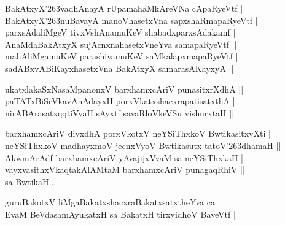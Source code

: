 \begin{entry}
\begin{shl}
BakAtxyX{\char'263}vadhAnayA rUpamahaMkAreVNa cApaRyeVtf |\\[2pt]
BakAtxyX{\char'263}nuBavayA manoVhasetxVna sapxshaRmapaRyeVtf |\\[2pt]
parxsAdaliMgeV tivxVshAnamuKeV shabadxparxsAdakamf |\\[2pt]
AnaMdaBakAtxyX sujAcnxnahasetxVneYva samapaRyeVtf ||\\[2pt]
mahAliMgamuKeV parashivamuKeV saMkalapxmapaRyeVtf |\\[2pt]
sadABxvABiKayxhasetxVna BakAtxyX samarasAKayxyA ||\\[-1pt]
\end{shl}
\medskip
{}
\smallskip
{}
\medskip
\begin{shl}
ukatxlakaSxNasaMpanonxV barxhamxcAriV punasitxrXdhA ||\\[2pt]
paTATxBiSeVkavAnAdayxH porxVkatxshacxrapatisatxthA |\\[2pt]
nirABArasatxqqtiVyaH sAyxtf savaRloVkeVSu vishurxtaH ||\\[-1pt]
\end{shl}
\medskip
{}
\smallskip
{}
\medskip
\begin{shl}
barxhamxcAriV divxdhA porxVkotxV neYSiThxkoV BwtikasitxvXti |\\[2pt]
neYSiThxkoV madhayxmoV jecnxVyoV Bwtikasutx tatoV{\char'263}dhamaH ||\\[2pt]
AkwmArAdf barxhamxcAriV yAvajijxVvaM sa neYSiThxkaH |\\[2pt]
vayxvasithxVkaqtakAlAMtaM barxhamxcAriV punagaqRhiV ||\\[2pt]
sa BwtikaH... |\\[-1pt]
\end{shl}
\smallskip
{}
\smallskip
{}
\medskip
\begin{shl}
guruBakotxV liMgaBakatxshacxraBakatxsatxtheYva ca |\\[2pt]
EvaM BeVdasamAyukatxH sa BakatxH tirxvidhoV BaveVtf |\\[-1pt]

\end{shl}
\end{entry}
